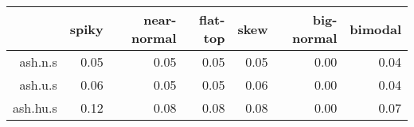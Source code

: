 \begin{tabular}{rrrrrrr}
  \toprule  & spiky & near-normal & flat-top & skew & big-normal & bimodal \\ 
  \midrule ash.n.s & 0.05 & 0.05 & 0.05 & 0.05 & 0.00 & 0.04 \\ 
  ash.u.s & 0.06 & 0.05 & 0.05 & 0.06 & 0.00 & 0.04 \\ 
  ash.hu.s & 0.12 & 0.08 & 0.08 & 0.08 & 0.00 & 0.07 \\ 
   \bottomrule \end{tabular}

